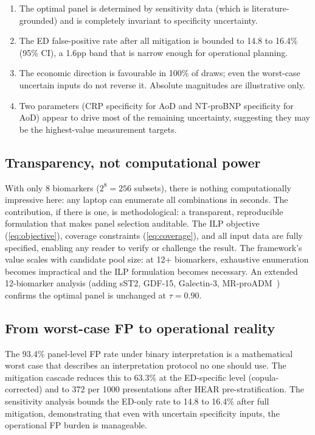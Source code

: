 \documentclass[11pt, oneside]{article}
\begin{document}
\begin{enumerate}
\item The optimal panel is determined by sensitivity data (which is literature-grounded) and is completely invariant to specificity uncertainty.
\item The ED false-positive rate after all mitigation is bounded to 14.8 to 16.4\% (95\% CI), a 1.6pp band that is narrow enough for operational planning.
\item The economic direction is favourable in 100\% of draws; even the worst-case uncertain inputs do not reverse it. Absolute magnitudes are illustrative only.
\item Two parameters (CRP specificity for AoD and NT-proBNP specificity for AoD) appear to drive most of the remaining uncertainty, suggesting they may be the highest-value measurement targets.
\end{enumerate}

\subsection{Transparency, not computational power}

With only 8 biomarkers ($2^8 = 256$ subsets), there is nothing computationally impressive here: any laptop can enumerate all combinations in seconds. The contribution, if there is one, is methodological: a transparent, reproducible formulation that makes panel selection auditable. The ILP objective (\cref{eq:objective}), coverage constraints (\cref{eq:coverage}), and all input data are fully specified, enabling any reader to verify or challenge the result. The framework's value scales with candidate pool size: at 12+ biomarkers, exhaustive enumeration becomes impractical and the ILP formulation becomes necessary. An extended 12-biomarker analysis (adding sST2, GDF-15, Galectin-3, MR-proADM~\cite{Dieplinger2015,Januzzi2016,Kempf2007,Wollert2017,deBoer2012,Nishida2008,Maisel2010}) confirms the optimal panel is unchanged at $\tau = 0.90$.

\subsection{From worst-case FP to operational reality}

The 93.4\% panel-level FP rate under binary interpretation is a mathematical worst case that describes an interpretation protocol no one should use. The mitigation cascade reduces this to 63.3\% at the ED-specific level (copula-corrected) and to 372 per 1000 presentations after HEAR pre-stratification. The sensitivity analysis bounds the ED-only rate to 14.8 to 16.4\% after full mitigation, demonstrating that even with uncertain specificity inputs, the operational FP burden is manageable.
\end{document}
